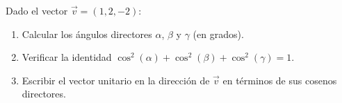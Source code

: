 Dado el vector $\vec{v} = (1, 2, -2)$:
\begin{enumerate}
    \item Calcular los ángulos directores $\alpha$, $\beta$ y $\gamma$ (en grados).
    \item Verificar la identidad $\cos^2(\alpha) + \cos^2(\beta) + \cos^2(\gamma) = 1$.
    \item Escribir el vector unitario en la dirección de $\vec{v}$ en términos de sus cosenos directores.
\end{enumerate}